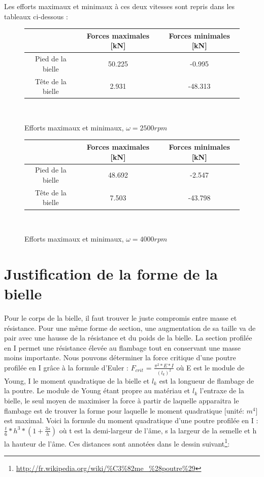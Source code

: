 \documentclass[a4paper,oneside,12pt]{report}
\begin{document}
Les efforts maximaux et minimaux à ces deux vitesses sont repris dans les tableaux ci-dessous : \\

\begin{figure}[h!]
\begin{center}
\begin{tabular}{|c||c|c|}
\hline 
\ & Forces maximales [kN] & Forces minimales [kN] \\ 
\hline 
Pied de la bielle & 50.225 & -0.995 \\ 
\hline 
Tête de la bielle & 2.931 & -48.313 \\ 
\hline 
\end{tabular} \\
\end{center}
\caption{Efforts maximaux et minimaux, $\omega=2500rpm$}
\end{figure}

\begin{figure}[h!]
\begin{center}
\begin{tabular}{|c||c|c|}
\hline 
\ & Forces maximales [kN] & Forces minimales [kN] \\ 
\hline 
Pied de la bielle & 48.692 & -2.547 \\ 
\hline 
Tête de la bielle &  7.503 & -43.798 \\ 
\hline 
\end{tabular} \\
\caption{Efforts maximaux et minimaux, $\omega=4000rpm$}
\end{center}
\end{figure}

\section{Justification de la forme de la bielle}

 Pour le corps de la bielle, il faut trouver le juste compromis entre masse et résistance. Pour une même forme de section, une augmentation de sa taille va de pair avec une hausse de la résistance et du poids de la bielle. La section profilée en I permet une résistance élevée au flambage tout en conservant une masse moins importante. Nous pouvons déterminer la force critique d'une poutre profilée en I grâce à la formule d'Euler : $F_{crit}$ = $\frac{\pi^2 *E*I}{(l_k)^2}$ où E est le module de Young, I le moment quadratique de la bielle et $l_k$ est la longueur de flambage de la poutre. Le module de Young étant propre au matériau et $l_k$ l'entraxe de la bielle, le seul moyen de maximiser la force à partir de laquelle apparaitra le flambage est de trouver la forme pour laquelle le moment quadratique [unité: $m^4$] est maximal. Voici la formule du moment quadratique d'une poutre profilée en I : $\frac{t}{6}*h^3*(1+\frac{3s}{h})$ où t est la demi-largeur de l'âme, s la largeur de la semelle et h la hauteur de l'âme. Ces distances sont annotées dans le dessin suivant\footnote{\url{http://fr.wikipedia.org/wiki/\%C3\%82me_\%28poutre\%29}}:
 
\end{document}
